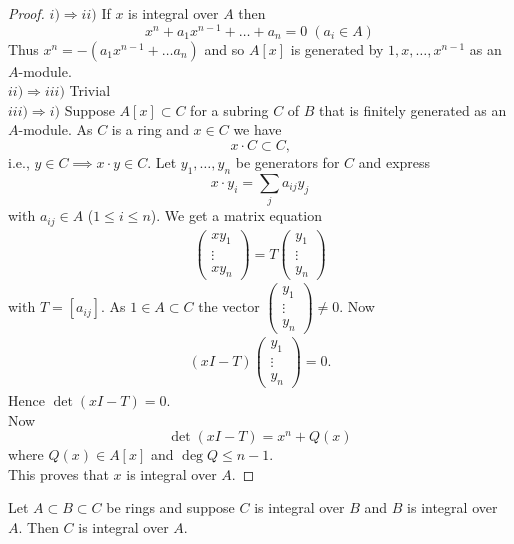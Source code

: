 \documentclass[NumTh.tex]{subfiles}
\begin{document}
\begin{proof}
  $i) \Rightarrow ii)$  If $x$ is integral over $A$ then
  \[ x^n + a_1 x^{n-1} + \dots + a_n = 0 \; (a_i \in A) \]
  Thus $x^n = - (a_1x^{n-1} + \dots a_n)$ and so $A[x]$ is generated by $1,x,\dots,x^{n-1}$ as an $A$-module. \\
  $ii) \Rightarrow iii)$ Trivial \\
  $iii) \Rightarrow i)$ Suppose $A[x] \subset C$ for a subring $C$ of $B$ that is finitely generated as an $A$-module.
  As $C$ is a ring and $x \in C$ we have
  \[ x \cdot C \subset C \text{,} \] 
  i.e., $y \in C \implies x \cdot y \in C$.
  Let $y_1,\dots,y_n$ be generators for $C$ and express 
  \[ x \cdot y_i = \sum_{j} a_{ij}y_j \]
  with $a_{ij} \in A$ ($1 \leq i \leq n$).
  We get a matrix equation 
  \begin{align*}
    \begin{pmatrix}
      xy_1 \\
      \vdots \\
      xy_n
    \end{pmatrix}
    = T
    \begin{pmatrix}
      y_1 \\
      \vdots \\
      y_n
    \end{pmatrix}
  \end{align*}
  with $T = [a_{ij}]$.
  As $1 \in A \subset C$ the vector $
  \begin{pmatrix}
    y_1 \\
    \vdots \\
    y_n
  \end{pmatrix}
  \neq 0$.
  Now
  \begin{align*}
    (xI - T) 
    \begin{pmatrix}
      y_1 \\
      \vdots \\
      y_n
    \end{pmatrix}
    = 0 \text{.}
  \end{align*}
  Hence $\det(xI -T) = 0$.\\
  Now 
  \[ \det(xI - T) = x^n + Q(x) \]
  where $Q(x) \in A[x]$ and $\deg Q \leq n-1$.\\
  
  This proves that $x$ is integral over $A$.
\end{proof}

\begin{cor}\label{cor_3_3_3}
  Let $A \subset B \subset C$ be rings and suppose $C$ is integral over $B$ and $B$ is integral over $A$.
  Then $C$ is  integral over $A$.
\end{cor}
\end{document}
